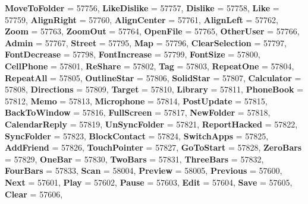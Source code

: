 \begin{DoxyCompactItemize}
{\bfseries Move\+To\+Folder} = 57756, 
{\bfseries Like\+Dislike} = 57757, 
{\bfseries Dislike} = 57758, 
{\bfseries Like} = 57759, 
\newline
{\bfseries Align\+Right} = 57760, 
{\bfseries Align\+Center} = 57761, 
{\bfseries Align\+Left} = 57762, 
{\bfseries Zoom} = 57763, 
\newline
{\bfseries Zoom\+Out} = 57764, 
{\bfseries Open\+File} = 57765, 
{\bfseries Other\+User} = 57766, 
{\bfseries Admin} = 57767, 
\newline
{\bfseries Street} = 57795, 
{\bfseries Map} = 57796, 
{\bfseries Clear\+Selection} = 57797, 
{\bfseries Font\+Decrease} = 57798, 
\newline
{\bfseries Font\+Increase} = 57799, 
{\bfseries Font\+Size} = 57800, 
{\bfseries Cell\+Phone} = 57801, 
{\bfseries Re\+Share} = 57802, 
\newline
{\bfseries Tag} = 57803, 
{\bfseries Repeat\+One} = 57804, 
{\bfseries Repeat\+All} = 57805, 
{\bfseries Outline\+Star} = 57806, 
\newline
{\bfseries Solid\+Star} = 57807, 
{\bfseries Calculator} = 57808, 
{\bfseries Directions} = 57809, 
{\bfseries Target} = 57810, 
\newline
{\bfseries Library} = 57811, 
{\bfseries Phone\+Book} = 57812, 
{\bfseries Memo} = 57813, 
{\bfseries Microphone} = 57814, 
\newline
{\bfseries Post\+Update} = 57815, 
{\bfseries Back\+To\+Window} = 57816, 
{\bfseries Full\+Screen} = 57817, 
{\bfseries New\+Folder} = 57818, 
\newline
{\bfseries Calendar\+Reply} = 57819, 
{\bfseries Un\+Sync\+Folder} = 57821, 
{\bfseries Report\+Hacked} = 57822, 
{\bfseries Sync\+Folder} = 57823, 
\newline
{\bfseries Block\+Contact} = 57824, 
{\bfseries Switch\+Apps} = 57825, 
{\bfseries Add\+Friend} = 57826, 
{\bfseries Touch\+Pointer} = 57827, 
\newline
{\bfseries Go\+To\+Start} = 57828, 
{\bfseries Zero\+Bars} = 57829, 
{\bfseries One\+Bar} = 57830, 
{\bfseries Two\+Bars} = 57831, 
\newline
{\bfseries Three\+Bars} = 57832, 
{\bfseries Four\+Bars} = 57833, 
{\bfseries Scan} = 58004, 
{\bfseries Preview} = 58005, 
\newline
{\bfseries Previous} = 57600, 
{\bfseries Next} = 57601, 
{\bfseries Play} = 57602, 
{\bfseries Pause} = 57603, 
\newline
{\bfseries Edit} = 57604, 
{\bfseries Save} = 57605, 
{\bfseries Clear} = 57606, 

\end{DoxyCompactItemize}
